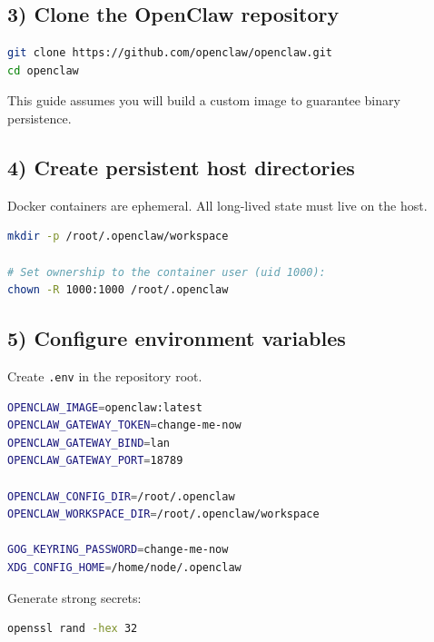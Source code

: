 \hrulefill


\subsection{3) Clone the OpenClaw repository}


\begin{lstlisting}[language=bash]
git clone https://github.com/openclaw/openclaw.git
cd openclaw
\end{lstlisting}


This guide assumes you will build a custom image to guarantee binary persistence.

\hrulefill


\subsection{4) Create persistent host directories}


Docker containers are ephemeral.
All long-lived state must live on the host.

\begin{lstlisting}[language=bash]
mkdir -p /root/.openclaw/workspace

# Set ownership to the container user (uid 1000):
chown -R 1000:1000 /root/.openclaw
\end{lstlisting}


\hrulefill


\subsection{5) Configure environment variables}


Create \texttt{.env} in the repository root.

\begin{lstlisting}[language=bash]
OPENCLAW_IMAGE=openclaw:latest
OPENCLAW_GATEWAY_TOKEN=change-me-now
OPENCLAW_GATEWAY_BIND=lan
OPENCLAW_GATEWAY_PORT=18789

OPENCLAW_CONFIG_DIR=/root/.openclaw
OPENCLAW_WORKSPACE_DIR=/root/.openclaw/workspace

GOG_KEYRING_PASSWORD=change-me-now
XDG_CONFIG_HOME=/home/node/.openclaw
\end{lstlisting}


Generate strong secrets:

\begin{lstlisting}[language=bash]
openssl rand -hex 32
\end{lstlisting}


